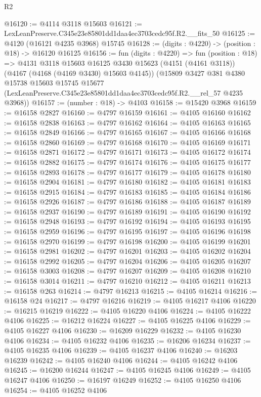 \begin{lexlean}{R2}
\begin{coremodule}
@16120 := @4114 @3118 @15603
@16121 := LexLeanPreserve.C345e23e85801dd1daa4ec3703cedc95f.R2.__fits_50
@16125 := @4120 (@16121 @4235 @3968) @15745
@16128 := (digits : @4220) -> (position : @18) -> @16120 @16125
@16156 := fun (digits : @4220) =>
  fun (position : @18) =>
  @4131
    @3118
    @15603
    @16125
    @3430
    @15623
    (@4151 (@4161 @3118))
    (@4167 (@4168 (@4169 @3430) @15603 @4145))
    (@15809
      @3427
      @381
      @4380
      @15738
      @15603
      @15745
      @15677
      (LexLeanPreserve.C345e23e85801dd1daa4ec3703cedc95f.R2.__rel_57 @4235 @3968))
@16157 := (number : @18) -> @4103
@16158 := @15420 @3968
@16159 := @16158 @2827
@16160 := @4797 @16159
@16161 := @4105 @16160
@16162 := @16158 @2838
@16163 := @4797 @16162
@16164 := @4105 @16163
@16165 := @16158 @2849
@16166 := @4797 @16165
@16167 := @4105 @16166
@16168 := @16158 @2860
@16169 := @4797 @16168
@16170 := @4105 @16169
@16171 := @16158 @2871
@16172 := @4797 @16171
@16173 := @4105 @16172
@16174 := @16158 @2882
@16175 := @4797 @16174
@16176 := @4105 @16175
@16177 := @16158 @2893
@16178 := @4797 @16177
@16179 := @4105 @16178
@16180 := @16158 @2904
@16181 := @4797 @16180
@16182 := @4105 @16181
@16183 := @16158 @2915
@16184 := @4797 @16183
@16185 := @4105 @16184
@16186 := @16158 @2926
@16187 := @4797 @16186
@16188 := @4105 @16187
@16189 := @16158 @2937
@16190 := @4797 @16189
@16191 := @4105 @16190
@16192 := @16158 @2948
@16193 := @4797 @16192
@16194 := @4105 @16193
@16195 := @16158 @2959
@16196 := @4797 @16195
@16197 := @4105 @16196
@16198 := @16158 @2970
@16199 := @4797 @16198
@16200 := @4105 @16199
@16201 := @16158 @2981
@16202 := @4797 @16201
@16203 := @4105 @16202
@16204 := @16158 @2992
@16205 := @4797 @16204
@16206 := @4105 @16205
@16207 := @16158 @3003
@16208 := @4797 @16207
@16209 := @4105 @16208
@16210 := @16158 @3014
@16211 := @4797 @16210
@16212 := @4105 @16211
@16213 := @16158 @263
@16214 := @4797 @16213
@16215 := @4105 @16214
@16216 := @16158 @24
@16217 := @4797 @16216
@16219 := @4105 @16217 @4106
@16220 := @16215 @16219
@16222 := @4105 @16220 @4106
@16224 := @4105 @16222 @4106
@16225 := @16212 @16224
@16227 := @4105 @16225 @4106
@16229 := @4105 @16227 @4106
@16230 := @16209 @16229
@16232 := @4105 @16230 @4106
@16234 := @4105 @16232 @4106
@16235 := @16206 @16234
@16237 := @4105 @16235 @4106
@16239 := @4105 @16237 @4106
@16240 := @16203 @16239
@16242 := @4105 @16240 @4106
@16244 := @4105 @16242 @4106
@16245 := @16200 @16244
@16247 := @4105 @16245 @4106
@16249 := @4105 @16247 @4106
@16250 := @16197 @16249
@16252 := @4105 @16250 @4106
@16254 := @4105 @16252 @4106

\end{coremodule}
\end{lexlean}
